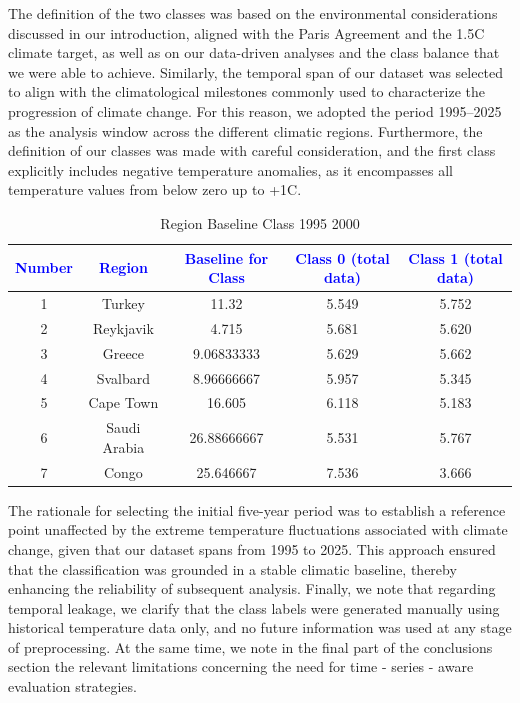 \documentclass[12pt]{Definitions/academia}
\begin{document}
The definition of the two classes was based on the environmental considerations
discussed in our introduction, aligned with the Paris Agreement and
the 1.5\textdegree C climate target, as well as on our data-driven analyses
and the class balance that we were able to achieve. Similarly, the
temporal span of our dataset was selected to align with the climatological
milestones commonly used to characterize the progression of climate
change. For this reason, we adopted the period 1995--2025 as the
analysis window across the different climatic regions. Furthermore,
the definition of our classes was made with careful consideration,
and the first class explicitly includes negative temperature anomalies,
as it encompasses all temperature values from below zero up to +1\textdegree C.

\begin{table}[H]

\begin{tabular}{|c|c|c|c|c|}
\hline
\textbf{\textcolor{blue}{Number}} & \textbf{\textcolor{blue}{Region}} & \textbf{\textcolor{blue}{Baseline for Class}} & \textbf{\textcolor{blue}{Class 0 (total data)}} & \textbf{\textcolor{blue}{Class 1 (total data)}}\tabularnewline
\hline
\hline
1 & Turkey & 11.32 & 5.549 & 5.752\tabularnewline
\hline
2 & Reykjavik & 4.715 & 5.681 & 5.620\tabularnewline
\hline
3 & Greece & 9.06833333 & 5.629 & 5.662\tabularnewline
\hline
4 & Svalbard & 8.96666667 & 5.957 & 5.345\tabularnewline
\hline
5 & Cape Town & 16.605 & 6.118 & 5.183\tabularnewline
\hline
6 & Saudi Arabia & 26.88666667 & 5.531 & 5.767\tabularnewline
\hline
7 & Congo & 25.646667 & 7.536 & 3.666\tabularnewline
\hline
\end{tabular}

\caption{Region Baseline Class 1995 2000\label{tab:Table-4-Region-Baseline-Class}}

\end{table}

The rationale for selecting the initial five-year period was to establish
a reference point unaffected by the extreme temperature fluctuations
associated with climate change, given that our dataset spans from
1995 to 2025. This approach ensured that the classification was grounded
in a stable climatic baseline, thereby enhancing the reliability of
subsequent analysis.
Finally, we note that regarding temporal leakage, we clarify that the class labels were generated manually using historical temperature data only, and no future information was used at any stage of preprocessing. At the same time, we note in the final part of the conclusions section the relevant limitations concerning the need for time - series - aware evaluation strategies.
\end{document}
